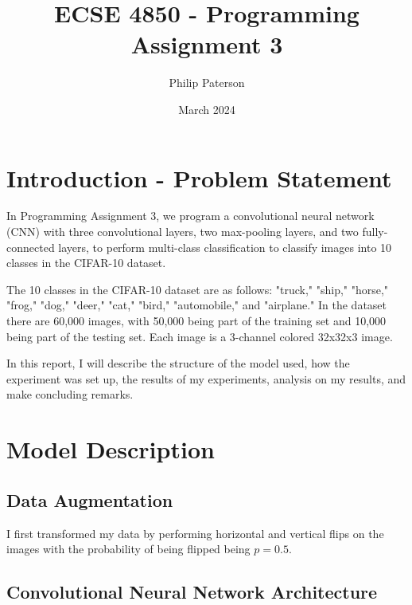 \documentclass{article}
\title{ECSE 4850 - Programming Assignment 3}
\author{Philip Paterson}
\date{March 2024}
\begin{document}
\maketitle

\section{Introduction - Problem Statement}
In Programming Assignment 3, we program a convolutional neural network (CNN) with three convolutional layers, two max-pooling layers, and two fully-connected layers, to perform multi-class classification to classify images into 10 classes in the CIFAR-10 dataset.

The 10 classes in the CIFAR-10 dataset are as follows: "truck," "ship," "horse," "frog," "dog," "deer," "cat," "bird," "automobile," and "airplane." In the dataset there are 60,000 images, with 50,000 being part of the training set and 10,000 being part of the testing set. Each image is a 3-channel colored 32x32x3 image.

In this report, I will describe the structure of the model used, how the experiment was set up, the results of my experiments, analysis on my results, and make concluding remarks.

\section{Model Description}

\subsection{Data Augmentation}
I first transformed my data by performing horizontal and vertical flips on the images with the probability of being flipped being $p=0.5$.

\subsection{Convolutional Neural Network Architecture}
\end{document}
